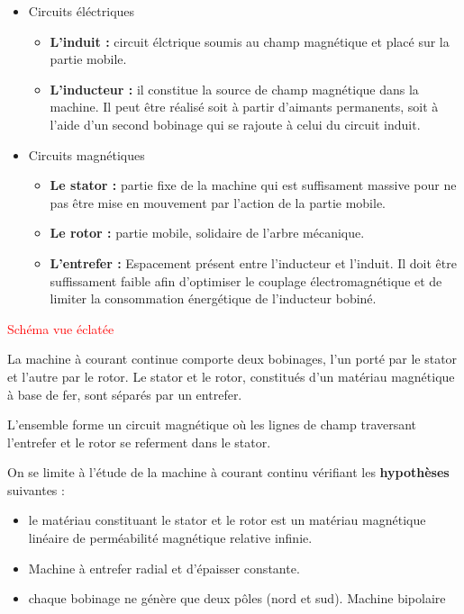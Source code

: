 \documentclass{article}
\begin{document}
\begin{itemize}
    \item Circuits éléctriques
    \begin{itemize}
        \item \textbf{L'induit :} circuit élctrique soumis au champ magnétique et placé sur la partie mobile.
        \item \textbf{L'inducteur :} il constitue la source de champ magnétique dans la machine. Il peut être réalisé soit à partir d'aimants permanents, soit à l'aide d'un second bobinage qui se rajoute à celui du circuit induit. 
    \end{itemize}
    \item Circuits magnétiques
    \begin{itemize}
        \item \textbf{Le stator :} partie fixe de la machine qui est suffisament massive pour ne pas être mise en mouvement par l'action de la partie mobile.
        \item \textbf{Le rotor :} partie mobile, solidaire de l'arbre mécanique.
        \item \textbf{L'entrefer :} Espacement présent entre l'inducteur et l'induit. Il doit être suffissament faible afin d'optimiser le couplage électromagnétique et de limiter la consommation énergétique de l'inducteur bobiné.
    \end{itemize}
\end{itemize}


\textcolor{red}{Schéma vue éclatée}


La machine à courant continue comporte deux bobinages, l'un porté par le stator et l'autre par le rotor. Le stator et le rotor, constitués d'un matériau magnétique à base de fer, sont séparés par un entrefer.\medskip

L'ensemble forme un circuit magnétique où les lignes de champ traversant l'entrefer et le rotor se referment dans le stator.\medskip

On se limite à l'étude de la machine à courant continu vérifiant les \textbf{hypothèses} suivantes :

\begin{itemize}
    \item le matériau constituant le stator et le rotor est un matériau magnétique linéaire de perméabilité magnétique relative infinie.
    \item Machine à entrefer radial et d'épaisser constante.
    \item chaque bobinage ne génère que deux pôles (nord et sud). Machine bipolaire
    
\end{itemize}
\end{document}
